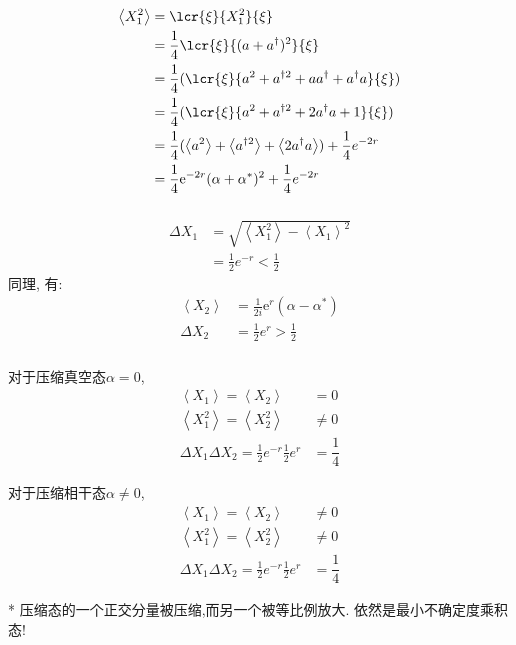 \begin{frame}
 \frametitle{}
 \[\begin{aligned}
    \left\langle X_1 ^2 \right\rangle &= \lcr {\xi} {X_1 ^2} {\xi}\\
    &= \frac{1}{4}\lcr {\xi} {(a+ a^{\dagger})^2 } {\xi}\\
    &= \frac{1}{4}(\lcr {\xi} { a^2 + a^{\dagger 2 }  + a a^{\dagger} + a^{\dagger} a } {\xi} )  \\ 
    &= \frac{1}{4}(\lcr {\xi} { a^2 + a^{\dagger 2 }  + 2 a^{\dagger} a +1 } {\xi} )  \\ 
    &= \frac{1}{4}( \left\langle a^2 \right\rangle + \left\langle a^{\dagger 2 } \right\rangle + \left\langle 2 a^{\dagger} a \right\rangle ) + \frac{1}{4} e^{-2r}    \\ 
    &= \frac{1}{4} \mathrm{e}^{-2r} (\alpha + \alpha^*)^2 +  \frac{1}{4} e^{-2r} 
\end{aligned} \]
\end{frame}

\begin{frame}
    \frametitle{}
    \[\begin{aligned}
       \Delta X_1 &= \sqrt{ \left\langle X_1 ^2 \right\rangle - \left\langle X_1 \right\rangle ^2 } \\ 
       &=\frac{1}{2} e^{-r} < \frac{1}{2} 
   \end{aligned} \]     
   同理, 有: 
   \[\begin{aligned}
    \left\langle X_2 \right\rangle &= \frac{1}{2i} \mathrm{e}^{r} (\alpha - \alpha^*) \\ 
    \Delta X_2 &= \frac{1}{2} e^{r}  > \frac{1}{2}
\end{aligned} \]  
\end{frame}

\begin{frame}
      \frametitle{}
  对于压缩真空态$\alpha=0$, 
  \[\begin{aligned}
    \left\langle X_1 \right\rangle=\left\langle X_2 \right\rangle &= 0 \\ 
    \left\langle X_1 ^2 \right\rangle=\left\langle X_2 ^2 \right\rangle & \not = 0 \\ 
    \Delta X_1 \Delta X_2 = \frac{1}{2} e^{-r} \frac{1}{2} e^{r} &= \dfrac{1}{4}
\end{aligned} \]  

对于压缩相干态$\alpha \not = 0$, 
\[\begin{aligned}
  \left\langle X_1 \right\rangle=\left\langle X_2 \right\rangle & \not = 0 \\ 
  \left\langle X_1 ^2 \right\rangle=\left\langle X_2 ^2 \right\rangle & \not = 0 \\ 
  \Delta X_1 \Delta X_2 = \frac{1}{2} e^{-r} \frac{1}{2} e^{r} &= \dfrac{1}{4}
\end{aligned} \] 

* 压缩态的一个正交分量被压缩,而另一个被等比例放大. 依然是最小不确定度乘积态!
\end{frame}



